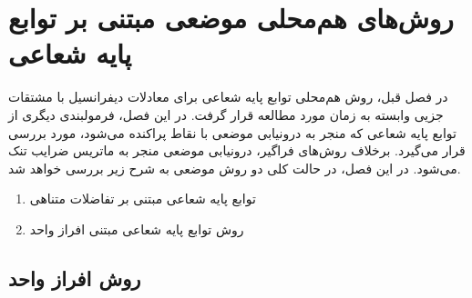 
\chapter{روش‌های هم‌محلی موضعی مبتنی بر توابع پایه شعاعی  }\label{se:rbfloc}
%
در فصل قبل، روش هم‌محلی توابع پایه شعاعی برای معادلات دیفرانسیل با مشتقات جزیی وابسته به زمان مورد مطالعه قرار گرفت. در این فصل، فرمولبندی دیگری از توابع پایه شعاعی که منجر به درونیابی موضعی با نقاط پراکنده  می‌شود، مورد بررسی قرار می‌گیرد. برخلاف روش‌های فراگیر، درونیابی موضعی منجر به ماتریس ضرایب تنک می‌شود. در این فصل، در حالت کلی دو روش موضعی به شرح زیر بررسی خواهد شد.

\begin{enumerate}
\item توابع پایه شعاعی مبتنی بر تفاضلات متناهی
\item روش توابع پایه شعاعی مبتنی افراز واحد
\end{enumerate}

\section{روش افراز واحد}